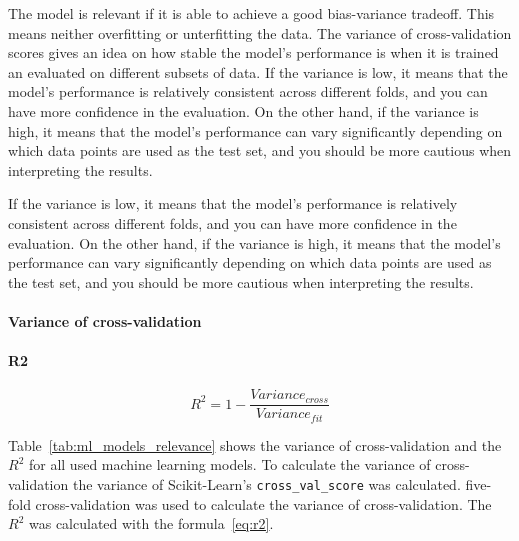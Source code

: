 
The model is relevant if it is able to achieve a good bias-variance tradeoff. This means neither overfitting or unterfitting the data.
The variance of cross-validation scores gives an idea on how stable the model's performance is when it is trained an evaluated on different subsets of data.
If the variance is low, it means that the model's performance is relatively consistent across different folds, and you can have more confidence in the evaluation. On the other hand, if the variance is high, it means that the model's performance can vary significantly depending on which data points are used as the test set, and you should be more cautious when interpreting the results.

If the variance is low, it means that the model's performance is relatively consistent across different folds, and you can have more confidence in the evaluation. On the other hand, if the variance is high, it means that the model's performance can vary significantly depending on which data points are used as the test set, and you should be more cautious when interpreting the results.

\paragraph*{Variance of cross-validation}




\paragraph*{R2}

\begin{equation}
    \label{eq:r2}
    R^2 = 1 - \frac{Variance_{cross}}{Variance_{fit}}
\end{equation}

Table~\ref*{tab:ml_models_relevance} shows the variance of cross-validation and the $R^2$ for all used machine learning models.
To calculate the variance of cross-validation  the variance of Scikit-Learn's \texttt{cross\_val\_score} was calculated. five-fold cross-validation was used to calculate the variance of cross-validation. The $R^2$ was calculated with the formula~\ref{eq:r2}.

